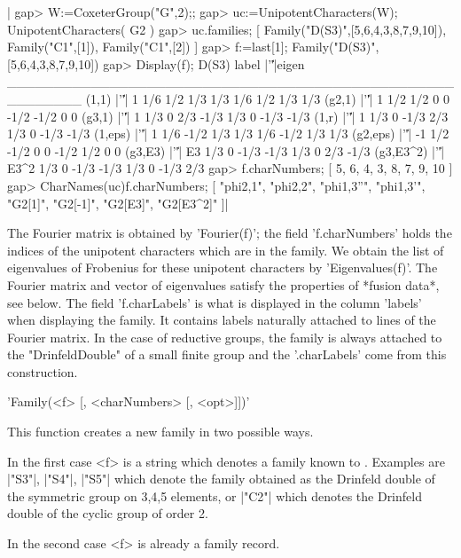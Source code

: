 |    gap> W:=CoxeterGroup("G",2);;
    gap> uc:=UnipotentCharacters(W);
    UnipotentCharacters( G2 )
    gap> uc.families;
    [ Family("D(S3)",[5,6,4,3,8,7,9,10]), Family("C1",[1]),
      Family("C1",[2]) ]
    gap> f:=last[1];
    Family("D(S3)",[5,6,4,3,8,7,9,10])
    gap> Display(f);
    D(S3)
        label |'\|'|eigen
    ________________________________________________________
    (1,1)     |'\|'|    1 1/6  1/2  1/3  1/3  1/6  1/2  1/3  1/3
    (g2,1)    |'\|'|    1 1/2  1/2    0    0 -1/2 -1/2    0    0
    (g3,1)    |'\|'|    1 1/3    0  2/3 -1/3  1/3    0 -1/3 -1/3
    (1,r)     |'\|'|    1 1/3    0 -1/3  2/3  1/3    0 -1/3 -1/3
    (1,eps)   |'\|'|    1 1/6 -1/2  1/3  1/3  1/6 -1/2  1/3  1/3
    (g2,eps)  |'\|'|   -1 1/2 -1/2    0    0 -1/2  1/2    0    0
    (g3,E3)   |'\|'|   E3 1/3    0 -1/3 -1/3  1/3    0  2/3 -1/3
    (g3,E3^2) |'\|'| E3^2 1/3    0 -1/3 -1/3  1/3    0 -1/3  2/3
    gap> f.charNumbers;
    [ 5, 6, 4, 3, 8, 7, 9, 10 ]
    gap> CharNames(uc){f.charNumbers};
    [ "phi{2,1}", "phi{2,2}", "phi{1,3}''", "phi{1,3}'", "G2[1]",
      "G2[-1]", "G2[E3]", "G2[E3^2]" ]|

The  Fourier matrix is obtained  by 'Fourier(f)'; the field 'f.charNumbers'
holds  the indices of the unipotent characters  which are in the family. We
obtain  the list of eigenvalues of Frobenius for these unipotent characters
by  'Eigenvalues(f)'. The Fourier matrix  and vector of eigenvalues satisfy
the  properties of  *fusion data*,  see below.  The field 'f.charLabels' is
what  is displayed  in the  column 'labels'  when displaying the family. It
contains  labels naturally attached to lines  of the Fourier matrix. In the
case   of  reductive  groups,   the  family  is   always  attached  to  the
"DrinfeldDouble"  of a small  finite group and  the '.charLabels' come from
this construction.

'Family(<f> [, <charNumbers> [, <opt>]])'

This function creates a new family in two possible ways.

In  the first case <f> is a string which denotes a family known to \CHEVIE.
Examples are |"S3"|, |"S4"|, |"S5"| which denote the family obtained as the
Drinfeld  double of the symmetric group  on 3,4,5 elements, or |"C2"| which
denotes the Drinfeld double of the cyclic group of order 2.

In the second case <f> is already a family record.

